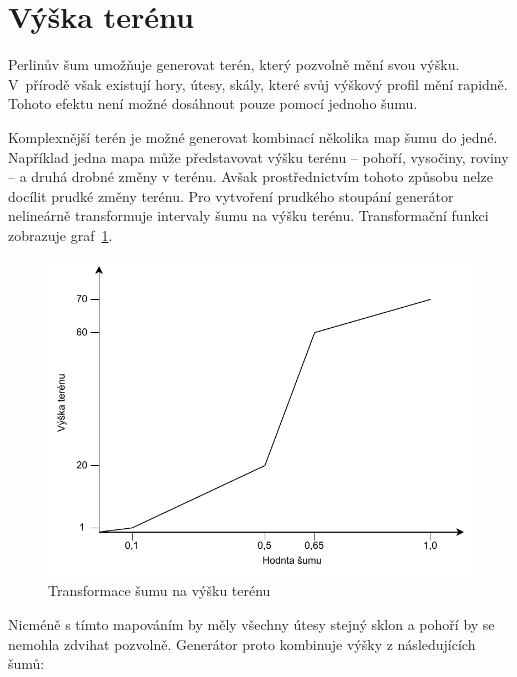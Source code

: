 \documentclass[thesis=M,czech]{FITthesis}[2019/12/23]
\begin{document}
\section{Výška terénu}

Perlinův šum umožňuje generovat terén, který pozvolně mění svou výšku. V~přírodě však existují hory, útesy, skály, které svůj výškový profil mění rapidně. Tohoto efektu není možné dosáhnout pouze pomocí jednoho šumu.

Komplexnější terén je možné generovat kombinací několika map šumu do jedné. Například jedna mapa může představovat výšku terénu – pohoří, vysočiny, roviny – a druhá drobné změny v terénu. Avšak prostřednictvím tohoto způsobu nelze docílit prudké změny terénu. Pro vytvoření prudkého stoupání generátor nelineárně transformuje intervaly šumu na výšku terénu. Transformační funkci zobrazuje graf~\ref{fig:noise_to_height}.

\begin{figure}\centering
	\includegraphics[width=\textwidth]{images/world_gen/noise_to_height}
	\caption[Transformace šumu na výšku terénu]{Transformace šumu na výšku terénu}\label{fig:noise_to_height}
\end{figure}

Nicméně s tímto mapováním by měly všechny útesy stejný sklon a pohoří by se nemohla zdvihat pozvolně. Generátor proto kombinuje výšky z následu\-jí\-cích šumů:
\end{document}
